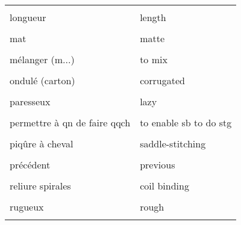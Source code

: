 \documentclass[
  10pt,
]{article}
\begin{document}
\begin{longtable}{ll}
\cellcolor{gray!6}{le dos d'un livre} & \cellcolor{gray!6}{the spine}\\

longueur & length\\

\cellcolor{gray!6}{lycée} & \cellcolor{gray!6}{high-school}\\

mat & matte\\

\cellcolor{gray!6}{mélanger (b...)} & \cellcolor{gray!6}{to blend}\\

mélanger (m...) & to mix\\

\cellcolor{gray!6}{obsolète} & \cellcolor{gray!6}{outdated}\\

ondulé (carton) & corrugated\\

\cellcolor{gray!6}{ondulé} & \cellcolor{gray!6}{wavy}\\

paresseux & lazy\\

\cellcolor{gray!6}{pelliculage} & \cellcolor{gray!6}{lamination}\\

permettre à qn de faire qqch & to enable sb to do stg\\

\cellcolor{gray!6}{permettre à quelqu'un de faire qqch} & \cellcolor{gray!6}{to allow sb to do stg}\\

piqûre à cheval & saddle-stitching\\

\cellcolor{gray!6}{profondeur} & \cellcolor{gray!6}{depth}\\

précédent & previous\\

\cellcolor{gray!6}{relier un livre} & \cellcolor{gray!6}{to bind a book}\\

reliure spirales & coil binding\\

\cellcolor{gray!6}{remarquer} & \cellcolor{gray!6}{to notice}\\

rugueux & rough\\

\cellcolor{gray!6}{réparer} & \cellcolor{gray!6}{to fix}\\


\end{longtable}
\end{document}
